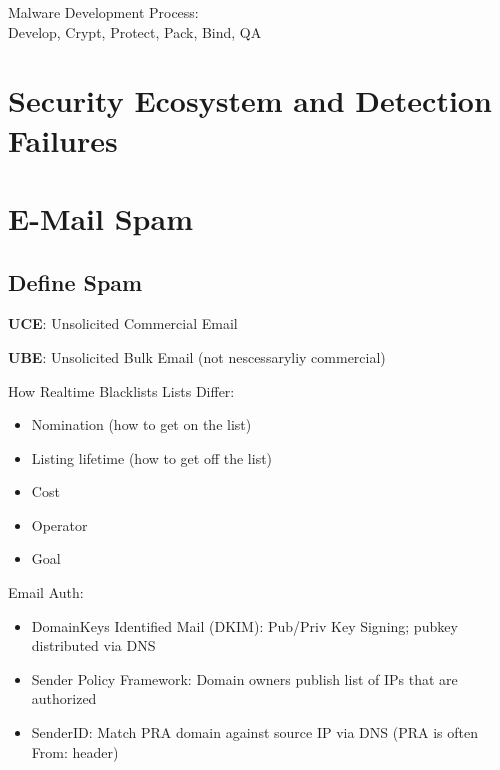 \documentclass[fs, footer]{latex4ei}
\begin{document}
\begin{multicols*}{4}
Malware Development Process:
\\Develop, Crypt, Protect, Pack, Bind, QA

\section{Security Ecosystem and Detection Failures}

\section{E-Mail Spam}
\subsection{Define Spam}
\textbf{UCE}: Unsolicited Commercial Email

\textbf{UBE}: Unsolicited Bulk Email (not nescessaryliy commercial)

How Realtime Blacklists Lists Differ:
\begin{itemize}
	\item Nomination (how to get on the list)
	\item Listing lifetime (how to get off the list)
	\item Cost
	\item Operator
	\item Goal
\end{itemize}

Email Auth:
\begin{itemize}
	\item DomainKeys Identified Mail (DKIM): Pub/Priv Key Signing; pubkey distributed via DNS
	\item Sender Policy Framework: Domain owners publish list of IPs that are authorized
	\item SenderID: Match PRA domain against source IP via DNS (PRA is often From: header)
	\end{itemize}

\end{multicols*}

\end{document}

